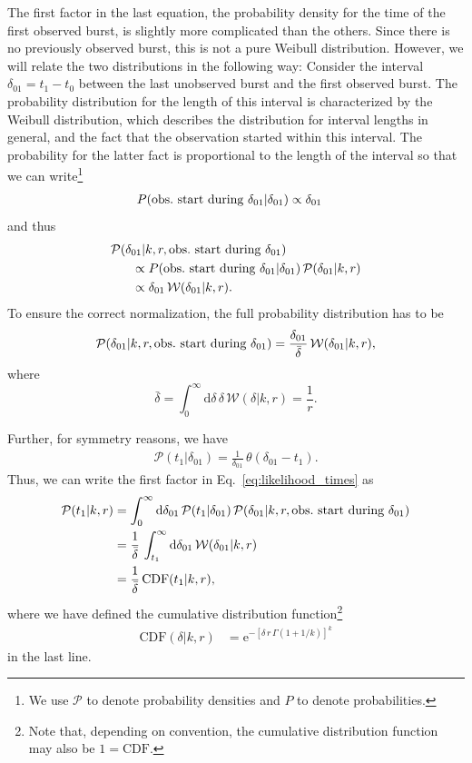 \documentclass[fleqn,usenatbib]{mnras}
\newcommand{\new}[1]{#1}
\renewcommand{\d}{\delta}
\begin{document}
The first factor in the last equation, the probability density for the time of the first observed burst, is slightly more complicated than the others. Since there is no previously observed burst, this is not a pure Weibull distribution. However, we will relate the two distributions in the following way: Consider the interval $\d_{01} = t_1 - t_0$ between the last unobserved burst and the first observed burst. The probability distribution for the length of this interval is characterized by the Weibull distribution, which describes the distribution for interval lengths in general, and the fact that the observation started within this interval. The probability for the latter fact is proportional to the length of the interval so that we can write\footnote{We use $\mathcal{P}$ to denote probability densities and $P$ to denote probabilities.}
\begin{align}
	P(\textnormal{obs.\ start during }\d_{01} | \d_{01}) &\propto \d_{01}
\end{align}
and thus
\begin{align}
	&\mathcal{P}(\d_{01}|k,r,\textnormal{obs.\ start during }\d_{01})\nonumber\\
	&~~~~~\propto P(\textnormal{obs.\ start during }\d_{01}|\d_{01}) \, \mathcal{P}(\d_{01}|k,r)\nonumber\\
	&~~~~~\propto \d_{01} \, \mathcal{W}(\d_{01}|k,r).
\end{align}
To ensure the correct normalization, the full probability distribution has to be
\begin{align}
	\mathcal{P}(\d_{01}|k,r,\textnormal{obs.\ start during }\d_{01}) = \frac{\d_{01}}{\bar{\d}} \, \mathcal{W}(\d_{01}|k,r),
\end{align}
where
\begin{equation}
	\label{eq:dbar_weibull}
	\bar{\d} = \int_0^\infty \mathrm{d}\d \, \d \, \mathcal{W}(\d|k,r) = \frac{1}{r}.
\end{equation}

Further, for symmetry reasons, we have
\begin{align}
 \mathcal{P}(t_1|\d_{01}) = \frac{1}{\d_{01}} \, \theta(\d_{01} - t_1).
\end{align}
Thus, we can write the first factor in Eq.~\eqref{eq:likelihood_times} as
\begin{align}
	\mathcal{P}(t_1|k,r) &= \int_0^\infty \mathrm{d}\d_{01} \, \mathcal{P}(t_1|\d_{01}) \, \mathcal{P}(\d_{01}|k,r,\textnormal{obs.\ start during }\d_{01})\nonumber\\
	&= \frac{1}{\bar{\d}} \, \int_{t_1}^\infty \mathrm{d}\d_{01} \, \mathcal{W}(\d_{01}|k,r)\nonumber\\
	&= \frac{1}{\bar{\d}} \, \mathrm{CDF}(t_1|k,r),
\end{align}
where we have defined the cumulative distribution function\footnote{\new{Note that, depending on convention, the cumulative distribution function may also be $1 = \mathrm{CDF}$.}}
\begin{align}
	\label{eq:cdf_weibull}
	\mathrm{CDF}(\d|k,r) &= \mathrm{e}^{-\left[\d\,r\,\Gamma(1 + 1/k)\right]^k}
\end{align}
in the last line.
\end{document}
